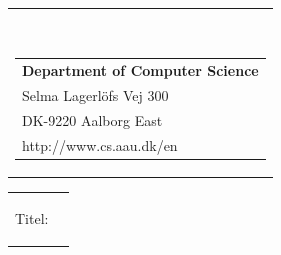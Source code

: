 


% 

\begin{nopagebreak}
{\samepage
\begin{flushright}
\begin{tabular}{r}
\parbox{\textwidth}{  
\hfill
\\
\parbox{8cm}{\begin{tabular}{l}
{\small \textbf{Department of Computer Science}}\\
{\small Selma Lagerlöfs Vej 300} \\
{\small DK-9220 Aalborg East} \\
{\small http://www.cs.aau.dk/en}
\end{tabular}}}

\end{tabular}

\end{flushright}

\begin{tabular}{cc}
\parbox{7cm}{
\begin{description}

\item {Titel:} 


\end{description}}
\end{tabular}}
\end{nopagebreak}
